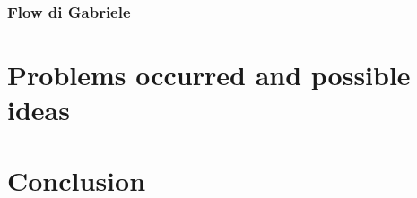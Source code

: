 \documentclass[10pt,twocolumn,hidelinks,letterpaper]{article}
\begin{document}
\subsubsection{Flow di Gabriele} %


\section{Problems occurred and possible ideas}

\section{Conclusion}

{\small


}
\end{document}
